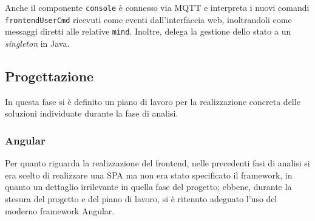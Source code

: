 

Anche il componente \texttt{console} è connesso via MQTT e interpreta i nuovi comandi \texttt{frontendUserCmd} ricevuti come eventi dall'interfaccia web, inoltrandoli come messaggi diretti alle relative \texttt{mind}.
Inoltre, delega la gestione dello stato a un \textit{singleton} in Java.

\subsection{Progettazione}

In questa fase si è definito un piano di lavoro per la realizzazione concreta delle soluzioni individuate durante la fase di analisi.

\subsubsection{Angular}

Per quanto riguarda la realizzazione del frontend, nelle precedenti fasi di analisi si era scelto di realizzare una SPA ma non era stato specificato il framework, in quanto un dettaglio irrilevante in quella fase del progetto;
ebbene, durante la stesura del progetto e del piano di lavoro, si è ritenuto adeguato l'uso del moderno framework Angular.

